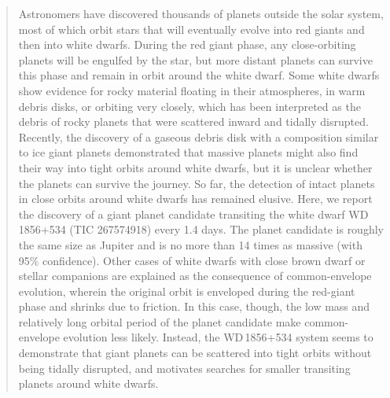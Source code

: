 \documentclass{nature3}
\newcommand*{\bedit}{\textcolor{new_black}}
\begin{document}
\begin{abstract}
Astronomers have discovered thousands of planets outside the solar system\cite{akeson2013}, most of which orbit stars that will eventually evolve into red giants and then into white dwarfs. During the red giant phase, any close-orbiting planets will be engulfed by the star\cite{Villaver2009}, but more distant planets can survive this phase and remain in orbit around the white dwarf\cite{luhman2011,marsh2014}. Some white dwarfs show evidence for rocky material floating in their atmospheres\cite{jura2003}, in warm debris disks\cite{kilic2005, becklin2005, gansicke2006, wilson2019}, or orbiting very closely\cite{wd1145, manser2019, vanderbosch2019}, which has been interpreted as the debris of rocky planets that were scattered inward and tidally disrupted\cite{debes2002}. Recently, the discovery of a gaseous debris disk with a composition similar to ice giant planets\cite{gansicke2019} demonstrated that massive planets might also find their way into tight orbits around white dwarfs, but it is unclear whether the planets can survive the journey. So far, the detection of intact planets in close orbits around white dwarfs has remained elusive. Here, we report the discovery of a giant planet candidate transiting the white dwarf WD\,1856+534 (TIC 267574918) every 1.4 days. The planet candidate is roughly the same size as Jupiter and is no more than 14 times as massive (with 95\% confidence). Other cases of white dwarfs with close brown dwarf or stellar companions are explained as the consequence of common-envelope evolution, wherein the original orbit is enveloped during the red-giant phase and shrinks due to friction. In this case, though, the low mass and relatively long orbital period of the planet candidate make \bedit{common-envelope evolution less likely}. Instead, the WD\,1856+534 system seems to demonstrate that giant planets can be scattered into tight orbits without being tidally disrupted, and motivates searches for smaller transiting planets around white dwarfs.


\end{abstract}
\end{document}
